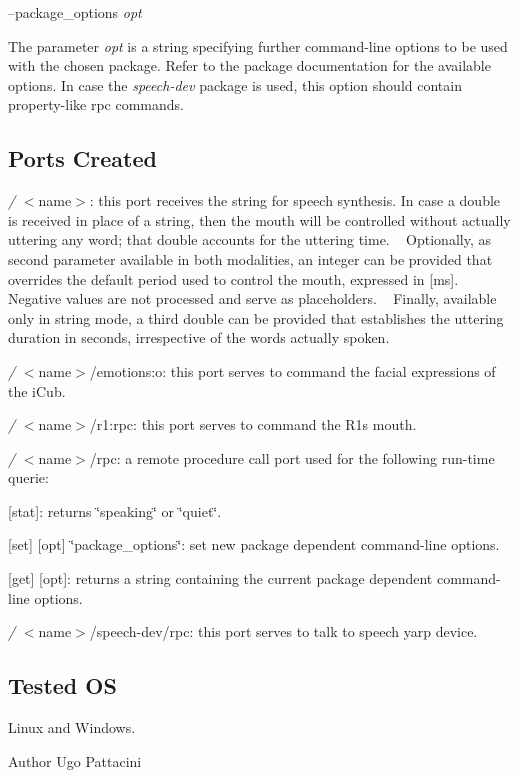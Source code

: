 --package\+\_\+options {\itshape opt} 
\begin{DoxyItemize}
\item The parameter {\itshape opt} is a string specifying further command-\/line options to be used with the chosen package. Refer to the package documentation for the available options. In case the {\itshape speech-\/dev} package is used, this option should contain property-\/like rpc commands.
\end{DoxyItemize}\hypertarget{group__windows-tts_portsc_sec}{}\subsection{Ports Created}\label{group__windows-tts_portsc_sec}

\begin{DoxyItemize}
\item {\itshape /} $<$name$>$\+: this port receives the string for speech synthesis. In case a double is received in place of a string, then the mouth will be controlled without actually uttering any word; that double accounts for the uttering time. ~\newline
 Optionally, as second parameter available in both modalities, an integer can be provided that overrides the default period used to control the mouth, expressed in \mbox{[}ms\mbox{]}. Negative values are not processed and serve as placeholders. ~\newline
 Finally, available only in string mode, a third double can be provided that establishes the uttering duration in seconds, irrespective of the words actually spoken.
\item {\itshape /} $<$name$>$/emotions\+:o\+: this port serves to command the facial expressions of the i\+Cub.
\item {\itshape /} $<$name$>$/r1\+:rpc\+: this port serves to command the R1\textquotesingle{}s mouth.
\item {\itshape /} $<$name$>$/rpc\+: a remote procedure call port used for the following run-\/time querie\+: ~\newline

\begin{DoxyItemize}
\item \mbox{[}stat\mbox{]}\+: returns \char`\"{}speaking\char`\"{} or \char`\"{}quiet\char`\"{}.
\item \mbox{[}set\mbox{]} \mbox{[}opt\mbox{]} \char`\"{}package\+\_\+options\char`\"{}\+: set new package dependent command-\/line options.
\item \mbox{[}get\mbox{]} \mbox{[}opt\mbox{]}\+: returns a string containing the current package dependent command-\/line options.
\end{DoxyItemize}
\item {\itshape /} $<$name$>$/speech-\/dev/rpc\+: this port serves to talk to speech yarp device.
\end{DoxyItemize}\hypertarget{group__windows-tts_tested_os_sec}{}\subsection{Tested OS}\label{group__windows-tts_tested_os_sec}
Linux and Windows.

\begin{DoxyAuthor}{Author}
Ugo Pattacini 
\end{DoxyAuthor}
